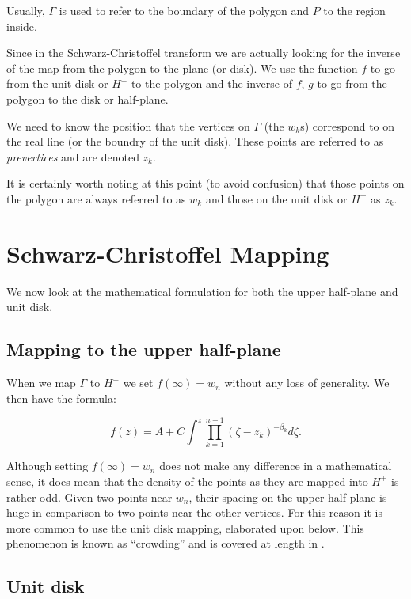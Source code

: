 \documentclass[a4paper,10pt]{amsart}
\newcommand{\sch}{Schwarz-Christoffel }
\begin{document}
Usually, $\Gamma$ is used to refer to the boundary of the polygon and $P$ to the region inside.

Since in the \sch transform we are actually looking for the inverse of the map from the polygon to the plane (or disk). We use the function $f$ to go from the unit disk or $H^+$ to the polygon and the inverse of $f$, $g$ to go from the polygon to the disk or half-plane.  

We need to know the position that the vertices on $\Gamma$ (the $w_k$s) correspond to on the real line (or the boundry of the unit disk). These points are referred to as \emph{prevertices} and are denoted $z_k$.

It is certainly worth noting at this point (to avoid confusion) that those points on the polygon are always referred to as $w_k$ and those on the unit disk or $H^+$ as $z_k$. 

 
\section{\sch Mapping}

We now look at the mathematical formulation for both the upper half-plane and unit disk.

\subsection{Mapping to the upper half-plane}

When we map $\Gamma$ to $H^+$ we set $f(\infty) = w_n$ without any loss of generality. We then have the formula:

\begin{equation}
f(z) = A + C \int^z \prod_{k=1}^{n-1} (\zeta-z_k)^{-\beta_k} d\zeta.
\end{equation}

Although setting $f(\infty) = w_n$ does not make any difference in a mathematical sense, it does mean that the density of the points as they are mapped into $H^+$ is rather odd. Given two points near $w_n$, their spacing on the upper half-plane is huge in comparison to two points near the other vertices. For this reason it is more common to use the unit disk mapping, elaborated upon below. This phenomenon is known as ``crowding'' and is covered at length in \cite{driscoll}. 

\subsection{Unit disk}
\end{document}
